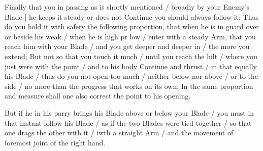 
Finally that you in passing as is shortly mentioned / broadly by your
Enemy's Blade | he keeps it steady or does not Continue you should
always follow it; Thus do you hold it with safety the following
proportion, that when he is in guard over or beside his weak / when he
is high pr low / enter with a steady Arm, that you reach him with your
Blade / and you get deeper and deeper in / the more you extend; But
not so that you touch it much / until you reach the hilt / where you
just were with the point / and to his body Continue and thrust / in
that equally his Blade / thus do you not open too much / neither below
nor above / or to the side / no more than the progress that works on
its own; In the same proportion and measure shall one also correct the
point to his opening.


But if he in his parry brings his Blade above or below your Blade /
you must in that instant follow his Blade / as if the two Blades were
tied together / so that one drags the other with it / iwth a straight
Arm / and the movement of foremost joint of the right hand.


